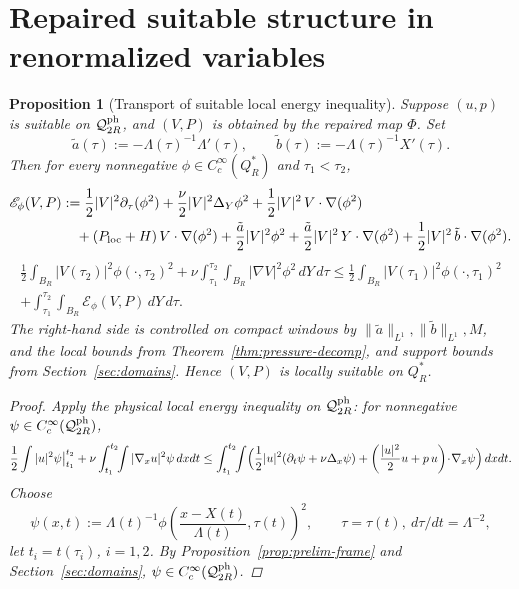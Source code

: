 \documentclass[11pt]{amsart}
\theoremstyle{plain}
\newtheorem{proposition}[theorem]{Proposition}
\theoremstyle{definition}
\theoremstyle{remark}
\newcommand{\nn}{\nabla}
\begin{document}
\section{Repaired suitable structure in renormalized variables}\label{sec:suitable}


\begin{proposition}[Transport of suitable local energy inequality]\label{prop:ren-suitable}
Suppose \((u,p)\) is suitable on \(\mathcal Q^{\rm ph}_{2R}\), and
\((V,P)\) is obtained by the repaired map \(\Phi\).
Set
\[
\tilde a(\tau):=-\Lambda(\tau)^{-1}\Lambda'(\tau),\qquad
\tilde b(\tau):=-\Lambda(\tau)^{-1}X'(\tau).
\]
Then for every nonnegative \(\phi\in C_c^\infty(Q_R^*)\) and \(\tau_1<\tau_2\),
\[
\begin{aligned}
\mathscr E_\phi(V,P)
&:=\frac12|V|^2\partial_\tau(\phi^2)
+\frac{\nu}{2}|V|^2\Delta_Y\phi^2
+\frac12|V|^2\,V\cdot\nn(\phi^2)\\
&\quad +(P_{\rm loc}+H)\,V\cdot\nn(\phi^2)
+\frac{\tilde a}{2}|V|^2\phi^2
+\frac{\tilde a}{2}|V|^2\,Y\cdot\nn(\phi^2)
+\frac12|V|^2\,\tilde b\cdot\nn(\phi^2).
\end{aligned}
\]
\begin{multline*}
\frac12\int_{B_R}|V(\tau_2)|^2\phi(\cdot,\tau_2)^2
+\nu\int_{\tau_1}^{\tau_2}\!\!\int_{B_R}|\nn V|^2\phi^2\,dY\,d\tau
\le \frac12\int_{B_R}|V(\tau_1)|^2\phi(\cdot,\tau_1)^2\\
 +\int_{\tau_1}^{\tau_2}\!\!\int_{B_R}\mathscr E_\phi(V,P)\,dY\,d\tau.
\end{multline*}
The right-hand side is controlled on compact windows by
\(\|\tilde a\|_{L^1},\|\tilde b\|_{L^1},M\), and the local bounds from
Theorem~\ref{thm:pressure-decomp}, and support bounds from Section~\ref{sec:domains}.
Hence \((V,P)\) is locally suitable on \(Q_R^*\).
\begin{proof}
Apply the physical local energy inequality on \(\mathcal Q^{\rm ph}_{2R}\): for
nonnegative \(\psi\in C_c^\infty(\mathcal Q^{\rm ph}_{2R})\),
    \[
    \frac12\int |u|^2\psi\big|_{t_1}^{t_2}
    +\nu\int_{t_1}^{t_2}\!\!\int |\nabla_xu|^2\psi\,dxdt
    \le\int_{t_1}^{t_2}\!\!\int\Bigl(
    \frac12|u|^2(\partial_t\psi+\nu\Delta_x\psi)
    +\left(\frac{|u|^2}{2}u+p\,u\right)\!\cdot\!\nabla_x\psi\Bigr)\,dxdt.
    \]
Choose
    \[
    \psi(x,t):=\Lambda(t)^{-1}\phi\!\left(\frac{x-X(t)}{\Lambda(t)},\tau(t)\right)^2,\qquad
    \tau=\tau(t),\ d\tau/dt=\Lambda^{-2},
    \]
let \(t_i=t(\tau_i)\), \(i=1,2\). 
    By Proposition~\ref{prop:prelim-frame} and Section~\ref{sec:domains}, \(\psi\in
    C_c^\infty(\mathcal Q^{\rm ph}_{2R})\).

\end{proof}
\end{proposition}
\end{document}
